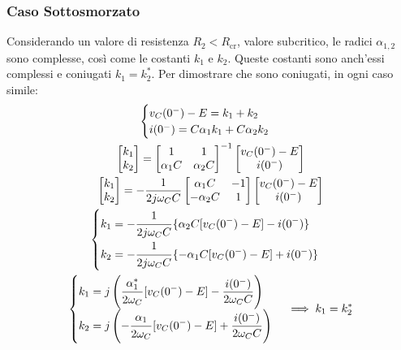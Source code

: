 \documentclass{article}
\numberwithin{equation}{subsection}
\begin{document}
\subsubsection{Caso Sottosmorzato}
Considerando un valore di resistenza $R_2<R_{\mathrm{cr}}$, valore subcritico, le radici $\alpha_{1,2}$ sono complesse, così come le costanti $k_1$ e $k_2$. Queste costanti sono anch'essi 
complessi e coniugati $k_1=k_2^*$. Per dimostrare che sono coniugati, in ogni caso simile:
\begin{gather*}
    \begin{cases}
        v_C(0^-)-E=k_1+k_2\\
        i(0^-)=C\alpha_1k_1+C\alpha_2k_2
    \end{cases}\\
    \begin{bmatrix}
        k_1\\k_2
    \end{bmatrix}=
    \begin{bmatrix}
        1&1\\\alpha_1C&\alpha_2C 
    \end{bmatrix}^{-1}
    \begin{bmatrix}
        v_C(0^-)-E\\i(0^-)
    \end{bmatrix}\\
    \begin{bmatrix}
        k_1\\k_2
    \end{bmatrix}=\displaystyle-\frac{1}{2j\omega_CC}
    \begin{bmatrix}
        \alpha_1C&-1\\-\alpha_2C&1
    \end{bmatrix}
    \begin{bmatrix}
        v_C(0^-)-E\\i(0^-)
    \end{bmatrix}\\
    \begin{cases}
        k_1=\displaystyle-\frac{\strut 1}{\strut 2j\omega_C C}\{\alpha_2C[v_C(0^-)-E]-i(0^-)\}\\
        k_2=\displaystyle-\frac{\strut 1}{\strut 2j\omega_C C}\{-\alpha_1C[v_C(0^-)-E]+i(0^-)\}
    \end{cases}\\
    \begin{cases}
        k_1=j\left(\displaystyle\frac{\strut \alpha_1^*}{\strut 2\omega_C}[v_C(0^-)-E]-\frac{i(0^-)}{2\omega_CC}\right)\\
        k_2=j\left(\displaystyle-\frac{\strut \alpha_1}{\strut 2\omega_C}[v_C(0^-)-E]+\frac{i(0^-)}{2\omega_CC}\right)
    \end{cases}\implies k_1=k_2^*
\end{gather*}
\end{document}
